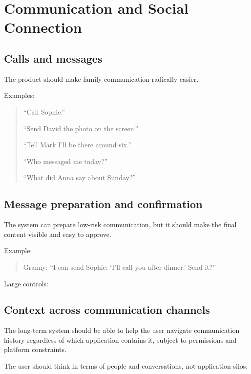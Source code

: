 \documentclass[11pt]{article}
\begin{document}
\section{Communication and Social Connection}

\subsection{Calls and messages}
The product should make family communication radically easier.

Examples:

\begin{quote}
``Call Sophie.''

``Send David the photo on the screen.''

``Tell Mark I'll be there around six.''

``Who messaged me today?''

``What did Anna say about Sunday?''
\end{quote}

\subsection{Message preparation and confirmation}
The system can prepare low-risk communication, but it should make the final content visible and easy to approve.

Example:

\begin{quote}
Granny: ``I can send Sophie: `I'll call you after dinner.' Send it?''
\end{quote}

Large controls:

\begin{center}
 \hspace{1.5cm}  \hspace{1.5cm} 
\end{center}

\subsection{Context across communication channels}
The long-term system should be able to help the user navigate communication history regardless of which application contains it, subject to permissions and platform constraints.

The user should think in terms of people and conversations, not application silos.
\end{document}
